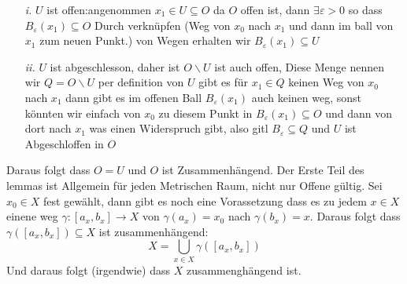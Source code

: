 \documentclass{article}
\begin{document}
\begin{itemize}
\item[\textit{i.}]{$U$ ist offen:\newline angenommen $x_1\in U \subseteq O$ da $O$ offen ist, dann $\exists \varepsilon >0$ so dass $B_\varepsilon(x_1) \subseteq O$ Durch verknüpfen (Weg von $x_0$ nach $x_1$ und dann im ball von $x_1$ zum neuen Punkt.) von Wegen erhalten wir $B_\varepsilon (x_1)\subseteq U$}
\item[\textit{ii.}]{$U$ ist abgeschlesson, daher ist $O\backslash U$ ist auch offen, Diese Menge nennen wir $Q=O\backslash U$ per definition von $U$ gibt es für $x_1\in Q$ keinen Weg von $x_0$ nach $x_1$ dann gibt es im offenen Ball $B_{\varepsilon}(x_1)$ auch keinen weg, sonst könnten wir einfach von $x_0$ zu diesem Punkt in $B_{\varepsilon}(x_1)\subseteq O$ und dann von dort nach $x_1$ was einen Widerspruch gibt, also gitl $B_{\varepsilon} \subseteq Q$ und $U$ ist Abgeschloffen in $O$ }
\end{itemize}
Daraus folgt dass $O=U$ und $O$ ist Zusammenhängend.
\newline Der Erste Teil des lemmas ist Allgemein für jeden Metrischen Raum, nicht nur Offene gültig.
\newline Sei $x_0\in X$ fest gewählt, dann gibt es noch eine Vorassetzung dass es zu jedem $x\in X$ einene weg $\gamma:[a_x,b_x]\rightarrow X$ von $\gamma(a_x)=x_0$ nach $\gamma(b_x)=x$. Daraus folgt dass $\gamma([a_x,b_x])\subseteq X$ ist zusammenhängend:
\[X=\bigcup_{x\in X}\gamma([a_x,b_x])\] Und daraus folgt (irgendwie) dass $X$ zusammenghängend ist.
\end{document}
